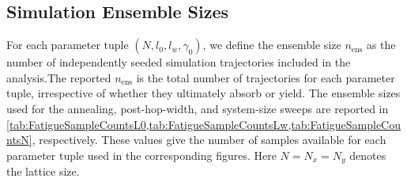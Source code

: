 \newpage
\begin{subappendices}

\section{Simulation Ensemble Sizes}
\label{sec:FatigueSampleCounts}

For each parameter tuple $(N,l_0,l_w,\gamma_0)$, we define the ensemble size $n_{\mathrm{ens}}$ as the number of independently seeded simulation trajectories included in the analysis.The reported $n_{\mathrm{ens}}$ is the total number of trajectories for each parameter tuple, irrespective of whether they ultimately absorb or yield. The ensemble sizes used for the annealing, post-hop-width, and system-size sweeps are reported in \cref{tab:FatigueSampleCountsL0,tab:FatigueSampleCountsLw,tab:FatigueSampleCountsN}, respectively. These values give the number of samples available for each parameter tuple used in the corresponding figures. Here $N=N_x=N_y$ denotes the lattice size.


\newpage



\end{subappendices}

